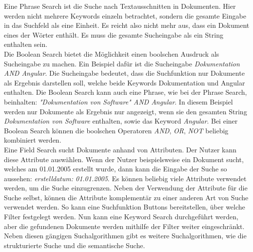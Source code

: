 Eine Phrase Search ist die Suche nach Textausschnitten in Dokumenten.
Hier werden nicht mehrere Keywords einzeln betrachtet, sondern die gesamte Eingabe in das Suchfeld als eine Einheit.
Es reicht also nicht mehr aus, dass ein Dokument eines der Wörter enthält.
Es muss die gesamte Sucheingabe als ein String enthalten sein.\\

Die Boolean Search bietet die Möglichkeit einen boolschen Ausdruck als Sucheingabe zu machen.
Ein Beispiel dafür ist die Sucheingabe \textit{Dokumentation AND Angular}.
Die Sucheingabe bedeutet, dass die Suchfunktion nur Dokumente als Ergebnis darstellen soll, welche beide Keywords Dokumentation und Angular enthalten.
Die Boolean Search kann auch eine Phrase, wie bei der Phrase Search, beinhalten: \textit{"Dokumentation von Software" AND Angular}.
In diesem Beispiel werden nur Dokumente als Ergebnis nur angezeigt, wenn sie den gesamten String \textit{Dokumentation von Software} enthalten, sowie das Keyword \textit{Angular}.
Bei einer Boolean Search können die boolschen Operatoren \textit{AND}, \textit{OR}, \textit{NOT} beliebig kombiniert werden.\\

Eine Field Search sucht Dokumente anhand von Attributen.
Der Nutzer kann diese Attribute auswählen.
Wenn der Nutzer beispielsweise ein Dokument sucht, welches am 01.01.2005 erstellt wurde, dann kann die Eingabe der Suche so aussehen: \textit{erstelldatum: 01.01.2005}.
Es können beliebig viele Attribute verwendet werden, um die Suche einzugrenzen.
Neben der Verwendung der Attribute für die Suche selbst, können die Attribute komplementär zu einer anderen Art von Suche verwendet werden.
So kann eine Suchfunktion Buttons bereitstellen, über welche Filter festgelegt werden.
Nun kann eine Keyword Search durchgeführt werden, aber die gefundenen Dokumente werden mithilfe der Filter weiter eingeschränkt.
Neben diesen gängigen Suchalgorithmen gibt es weitere Suchalgorithmen, wie die strukturierte Suche und die semantische Suche.